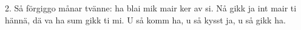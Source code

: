2.  Så förgiggo månar tvänne:
    ha blai mik mair ker av si.
    Nå gikk ja int mair ti hännä,
    dä va ha sum gikk ti mi.
    U så komm ha, u så kysst ja, u så gikk ha.
